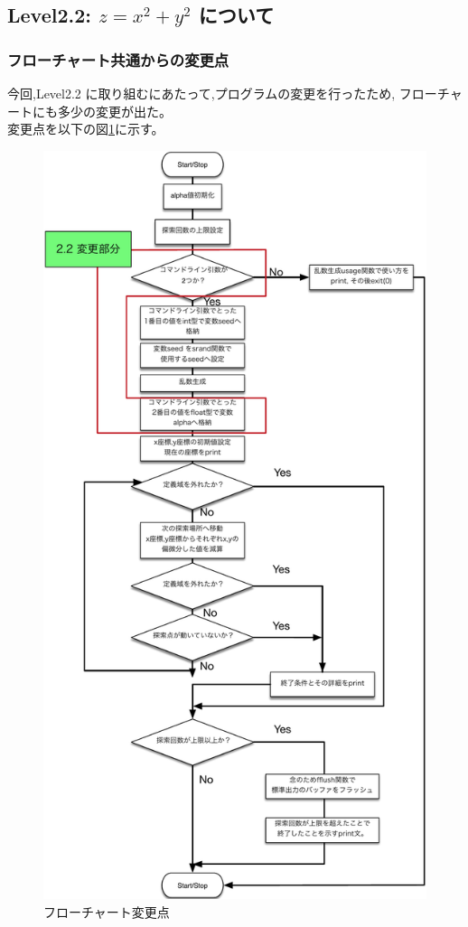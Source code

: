 \subsection{Level2.2: $z=x^2 + y^2$ について}
\subsubsection{フローチャート共通からの変更点}
今回,Level2.2 に取り組むにあたって,プログラムの変更を行ったため,
フローチャートにも多少の変更が出た。\\
変更点を以下の図\ref{flow2.2}に示す。\\
  \begin{figure}[H]
	\begin{center} %
	  \includegraphics[scale=0.45]{./figs/level2.2/flowchart2-2.pdf}
	  \caption{フローチャート変更点} %
	  \label{flow2.2} %
	\end{center}
  \end{figure}


